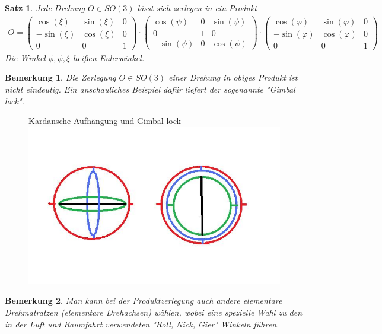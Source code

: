 \documentclass[]{article}
\newtheorem{Satz}{Satz}
\newtheorem{Bemerkung}{Bemerkung}
\begin{document}
\begin{Satz}
Jede Drehung  $O \in SO(3)$  lässt sich zerlegen in ein Produkt
\begin{align*}
O = 
\begin{pmatrix}
 \cos(\xi) &  \sin(\xi)  & 0\\ 
 - \sin(\xi) & \cos(\xi) & 0 \\
0 & 0 & 1 
\end{pmatrix} 
\cdot
\begin{pmatrix}
 \cos(\psi) & 0 &   \sin(\psi) \\ 
0 & 1 & 0 \\ 
- \sin(\psi) & 0& \cos(\psi)
\end{pmatrix}
\cdot \begin{pmatrix}
 \cos(\varphi) &  \sin(\varphi)  & 0\\ 
 - \sin(\varphi) & \cos(\varphi) & 0 \\
0 & 0 & 1 
\end{pmatrix} 
\end{align*} 
Die Winkel $\phi, \psi, \xi$ heißen  Eulerwinkel. 
\end{Satz}

\begin{Bemerkung}
Die  Zerlegung  $O \in SO(3)$  einer Drehung in obiges Produkt ist  nicht eindeutig.
Ein anschauliches Beispiel dafür liefert der sogenannte "Gimbal lock".
\end{Bemerkung}

\begin{figure}[H]
\centering
Kardansche Aufhängung und Gimbal lock\\
\includegraphics[scale=0.7]{gimbalLock.jpg}
\end{figure}

\begin{Bemerkung}
Man kann bei der Produktzerlegung auch andere elementare Drehmatratzen (elementare Drehachsen)  wählen, wobei
eine spezielle Wahl  zu den in der Luft und Raumfahrt verwendeten "Roll, Nick, Gier" Winkeln führen.
\end{Bemerkung}
\end{document}
